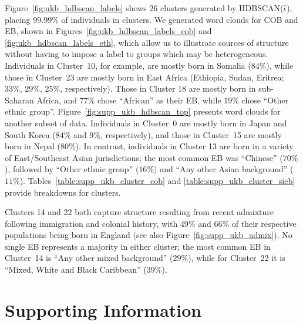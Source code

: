 \clearpage

Figure~\ref{fig:ukb_hdbscan_labels} shows $26$ clusters generated by HDBSCAN($\hat{\epsilon}$), placing $99.99\%$ of individuals in clusters. We generated word clouds for COB and EB, shown in Figures~\ref{fig:ukb_hdbscan_labels_cob} and \ref{fig:ukb_hdbscan_labels_eth}, which allow us to illustrate sources of structure without having to impose a label to groups which may be heterogeneous. Individuals in Cluster~10, for example, are mostly born in Somalia ($84\%$), while those in Cluster~23 are mostly born in East Africa (Ethiopia, Sudan, Eritrea; $33\%$, $29\%$, $25\%$, respectively). Those in Cluster 18 are mostly born in sub-Saharan Africa, and $77\%$ chose ``African'' as their EB, while $19\%$ chose ``Other ethnic group''. Figure~\ref{fig:supp_ukb_hdbscan_top} presents word clouds for another subset of data. Individuals in Cluster~0 are mostly born in Japan and South Korea ($84\%$ and $9\%$, respectively), and those in Cluster~15 are mostly born in Nepal ($80\%$). In contrast, individuals in Cluster 13 are born in a variety of East/Southeast Asian jurisdictions; the most common EB was ``Chinese'' ($70\%$), followed by ``Other ethnic group'' ($16\%$) and ``Any other Asian background'' ($11\%$). Tables~\ref{table:supp_ukb_cluster_cob} and \ref{table:supp_ukb_cluster_sieb} provide breakdowns for clusters.

Clusters 14 and 22 both capture structure resulting from recent admixture following immigration and colonial history, with $49\%$ and $66\%$ of their respective populations being born in England (see also Figure~\ref{fig:supp_ukb_admix}). No single EB represents a majority in either cluster; the most common EB in Cluster~14 is ``Any other mixed background'' ($29\%$), while for Cluster~22 it is ``Mixed, White and Black Caribbean'' ($39\%$). 


\clearpage

\section{Supporting Information}

